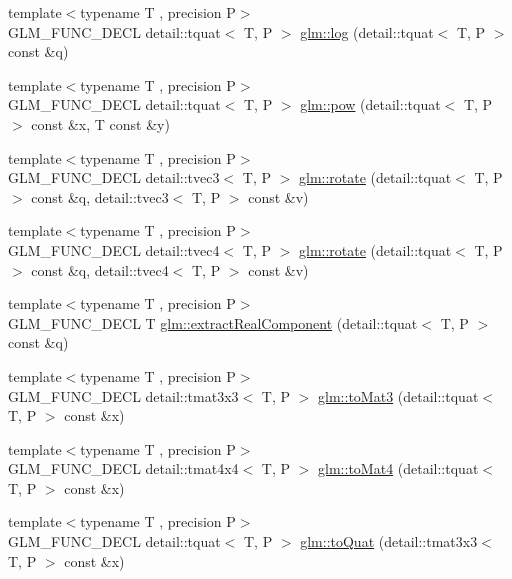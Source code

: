 \begin{DoxyCompactItemize}
\item 
{\footnotesize template$<$typename T , precision P$>$ }\\G\+L\+M\+\_\+\+F\+U\+N\+C\+\_\+\+D\+E\+CL detail\+::tquat$<$ T, P $>$ \hyperlink{group__gtx__quaternion_ga832e6b69f9e5f596cad8bada9ebb4477}{glm\+::log} (detail\+::tquat$<$ T, P $>$ const \&q)
\item 
{\footnotesize template$<$typename T , precision P$>$ }\\G\+L\+M\+\_\+\+F\+U\+N\+C\+\_\+\+D\+E\+CL detail\+::tquat$<$ T, P $>$ \hyperlink{group__gtx__quaternion_ga9c9854d641f71f853cfed9dc5d4ef762}{glm\+::pow} (detail\+::tquat$<$ T, P $>$ const \&x, T const \&y)
\item 
{\footnotesize template$<$typename T , precision P$>$ }\\G\+L\+M\+\_\+\+F\+U\+N\+C\+\_\+\+D\+E\+CL detail\+::tvec3$<$ T, P $>$ \hyperlink{group__gtx__quaternion_gaa4ac5806c1c001ac0247b1e1fd07dddf}{glm\+::rotate} (detail\+::tquat$<$ T, P $>$ const \&q, detail\+::tvec3$<$ T, P $>$ const \&v)
\item 
{\footnotesize template$<$typename T , precision P$>$ }\\G\+L\+M\+\_\+\+F\+U\+N\+C\+\_\+\+D\+E\+CL detail\+::tvec4$<$ T, P $>$ \hyperlink{group__gtx__quaternion_ga3461e43b8c7da533b10bc5e9961add80}{glm\+::rotate} (detail\+::tquat$<$ T, P $>$ const \&q, detail\+::tvec4$<$ T, P $>$ const \&v)
\item 
{\footnotesize template$<$typename T , precision P$>$ }\\G\+L\+M\+\_\+\+F\+U\+N\+C\+\_\+\+D\+E\+CL T \hyperlink{group__gtx__quaternion_gaad86e595f0021253cb9d34ca32f27f3c}{glm\+::extract\+Real\+Component} (detail\+::tquat$<$ T, P $>$ const \&q)
\item 
{\footnotesize template$<$typename T , precision P$>$ }\\G\+L\+M\+\_\+\+F\+U\+N\+C\+\_\+\+D\+E\+CL detail\+::tmat3x3$<$ T, P $>$ \hyperlink{group__gtx__quaternion_ga9955d74e4bdcfec4039c5285c6e99d8f}{glm\+::to\+Mat3} (detail\+::tquat$<$ T, P $>$ const \&x)
\item 
{\footnotesize template$<$typename T , precision P$>$ }\\G\+L\+M\+\_\+\+F\+U\+N\+C\+\_\+\+D\+E\+CL detail\+::tmat4x4$<$ T, P $>$ \hyperlink{group__gtx__quaternion_ga5d441af6e45262436e73070269d8470c}{glm\+::to\+Mat4} (detail\+::tquat$<$ T, P $>$ const \&x)
\item 
{\footnotesize template$<$typename T , precision P$>$ }\\G\+L\+M\+\_\+\+F\+U\+N\+C\+\_\+\+D\+E\+CL detail\+::tquat$<$ T, P $>$ \hyperlink{group__gtx__quaternion_ga7647cfc0f26055a4eea4f99a35964d7b}{glm\+::to\+Quat} (detail\+::tmat3x3$<$ T, P $>$ const \&x)

\end{DoxyCompactItemize}
